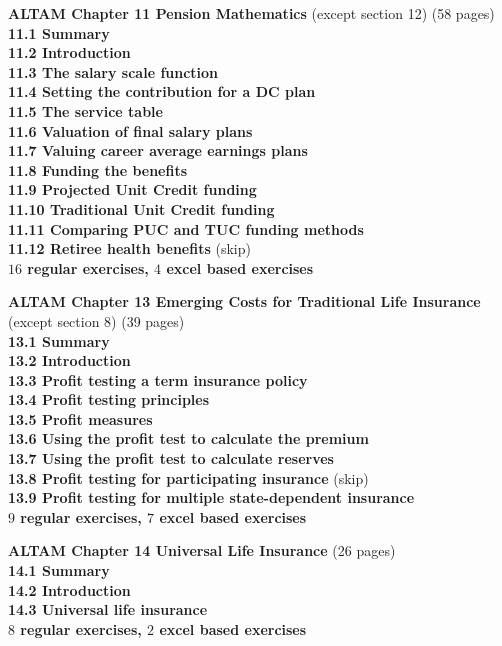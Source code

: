 \documentclass[hidelinks, 12pt]{article}
\theoremstyle{mydefstyle}
\theoremstyle{mythmstyle}
\begin{document}
\textbf{ALTAM Chapter 11 Pension Mathematics} (except section 12) (58 pages) \\
\textbf{11.1 Summary} \\
\textbf{11.2 Introduction} \\
\textbf{11.3 The salary scale function} \\
\textbf{11.4 Setting the contribution for a DC plan} \\
\textbf{11.5 The service table} \\
\textbf{11.6 Valuation of final salary plans} \\
\textbf{11.7 Valuing career average earnings plans} \\
\textbf{11.8 Funding the benefits} \\
\textbf{11.9 Projected Unit Credit funding} \\
\textbf{11.10 Traditional Unit Credit funding} \\
\textbf{11.11 Comparing PUC and TUC funding methods} \\
\textbf{11.12 Retiree health benefits} (skip) \\
\textbf{$16$ regular exercises, $4$ excel based exercises}

\textbf{ALTAM Chapter 13 Emerging Costs for Traditional Life Insurance} (except section 8) (39 pages) \\
\textbf{13.1 Summary} \\
\textbf{13.2 Introduction} \\
\textbf{13.3 Profit testing a term insurance policy} \\
\textbf{13.4 Profit testing principles} \\
\textbf{13.5 Profit measures} \\
\textbf{13.6 Using the profit test to calculate the premium} \\
\textbf{13.7 Using the profit test to calculate reserves} \\
\textbf{13.8 Profit testing for participating insurance} (skip) \\
\textbf{13.9 Profit testing for multiple state-dependent insurance} \\
\textbf{$9$ regular exercises, $7$ excel based exercises}

\textbf{ALTAM Chapter 14 Universal Life Insurance} (26 pages) \\
\textbf{14.1 Summary} \\
\textbf{14.2 Introduction} \\
\textbf{14.3 Universal life insurance} \\
\textbf{$8$ regular exercises, $2$ excel based exercises}
\end{document}
